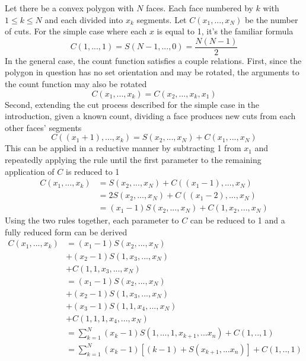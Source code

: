 \documentclass[12pt]{article}
\begin{document}
Let there be a convex polygon with $N$ faces. Each face numbered by $k$ with
$1 \le k \le N$ and each divided into $x_k$ segments.
Let $C(x_1,...,x_N)$ be the number of
cuts. For the simple case where each $x$ is equal to 1, it's the familiar
formula
\begin{equation}
    C(1,...,1) = S(N-1,...,0) = \frac{N (N - 1)}{2}
\end{equation}
In the general case, the count function satisfies a couple relations. First,
since the polygon in question has no set orientation and may be rotated, the
arguments to the count function may also be rotated
\begin{equation}
    C(x_1,...,x_k) = C(x_2,...,x_k,x_1)
\end{equation}
Second, extending the cut process described for the simple case in the introduction,
given a known count, dividing a face produces new cuts from each other faces'
segments
\begin{equation}
    C((x_1 + 1),...,x_k) = S(x_2,...,x_N) + C(x_1,...,x_N)
\end{equation}
This can be applied in a reductive manner by subtracting 1 from $x_1$
and repeatedly applying the rule until the first parameter to the
remaining application of $C$ is reduced to 1
\begin{equation}
\begin{aligned}
    C(x_1,...,x_k) &=           S(x_2,...,x_N) + C((x_1 - 1),...,x_N) \\
                   &=         2 S(x_2,...,x_N) + C((x_1 - 2),...,x_N) \\
                   &= (x_1 - 1) S(x_2,...,x_N) + C(1,x_2,...,x_N)
\end{aligned}
\end{equation}
Using the two rules together, each parameter to $C$ can be reduced to 1
and a fully reduced form can be derived
\begin{equation}
\begin{aligned}
    C(x_1,...,x_k) &= (x_1 - 1) S(x_2,...,x_N) \\
                   &+ (x_2 - 1) S(1,x_3,...,x_N) \\
                   &+ C(1,1,x_3,...,x_N) \\
                   &= (x_1 - 1) S(x_2,...,x_N) \\
                   &+ (x_2 - 1) S(1,x_3,...,x_N) \\
                   &+ (x_3 - 1) S(1,1,x_4,...,x_N) \\
                   &+ C(1,1,1,x_4,...,x_N) \\
                   &= \sum_{k=1}^{N} (x_k - 1) S(1,...,1,x_{k+1},...x_n) + C(1,..,1) \\
                   &= \sum_{k=1}^{N} (x_k - 1) \left[ (k-1) + S(x_{k+1},...x_n) \right] + C(1,..,1) \\
\end{aligned}
\end{equation}
\end{document}
